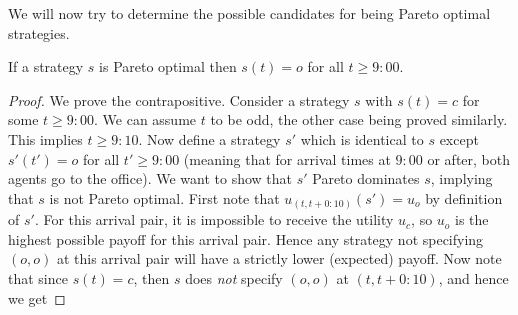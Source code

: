We will now try to determine the possible candidates for being Pareto optimal strategies. %
\begin{lemma}\label{lemma:no-canteen-at-nine}
If a strategy $s$ is Pareto optimal then $s(t) =o$ for all $t \geq 9{:}00$.
\end{lemma}
\begin{proof}
We prove the contrapositive. Consider a strategy $s$ with $s(t) = c$ for some $t \geq 9{:}00$. We can assume $t$ to be odd, the other case being proved similarly. This implies $t \geq 9{:}10$.
Now define a strategy $s'$ which is identical to $s$ except $s'(t') = o$ for all $t' \geq 9{:}00$ (meaning that for arrival times at $9{:}00$ or after, both agents go to the office).  We want to show that $s'$ Pareto dominates $s$, implying that $s$ is not Pareto optimal. First note that
 $u_{(t,t+0{:}10)}(s') = u_o$
 by definition of $s'$.
For this arrival pair, it is impossible to receive the utility $u_c$, so $u_o$ is the highest possible payoff for this arrival pair. 
Hence any strategy not specifying $(o,o)$ at this arrival pair 
will have a strictly lower (expected) payoff. Now note that since $s(t) = c$, then $s$ does \emph{not} specify $(o,o)$ at $(t,t+0{:}10)$, and hence we get 

\end{proof}
